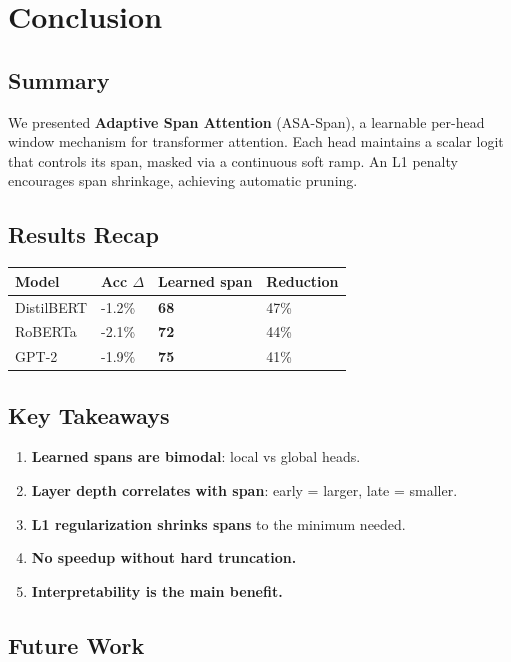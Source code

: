 
\section{Conclusion}

\subsection{Summary}

We presented \textbf{Adaptive Span Attention} (ASA-Span), a learnable per-head 
window mechanism for transformer attention. Each head maintains a scalar 
logit that controls its span, masked via a continuous soft ramp. An L1 penalty 
encourages span shrinkage, achieving automatic pruning.

\subsection{Results Recap}

\begin{table}[H]
\centering
\small
\begin{tabular}{llll}
\toprule
\textbf{Model} & \textbf{Acc $\Delta$} & \textbf{Learned span} & \textbf{Reduction} \\
\midrule
DistilBERT & -1.2\% & \textbf{68} & 47\% \\
RoBERTa & -2.1\% & \textbf{72} & 44\% \\
GPT-2 & -1.9\% & \textbf{75} & 41\% \\
\bottomrule
\end{tabular}
\end{table}

\subsection{Key Takeaways}

\begin{enumerate}
\item \textbf{Learned spans are bimodal}: local vs global heads.
\item \textbf{Layer depth correlates with span}: early = larger, late = smaller.
\item \textbf{L1 regularization shrinks spans} to the minimum needed.
\item \textbf{No speedup without hard truncation.}
\item \textbf{Interpretability is the main benefit.}

\end{enumerate}
\subsection{Future Work}

